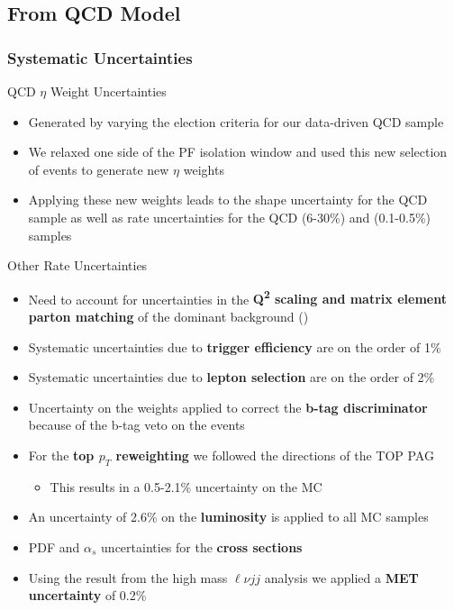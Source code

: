 
\subsection*{From QCD Model}


\begin{frame}
	\frametitle{Systematic Uncertainties}
	\vspace*{-0.24cm}
	\begin{block}{QCD $\eta$ Weight Uncertainties}
		\begin{itemize}
			\footnotesize
			\item Generated by varying the election criteria for our data-driven QCD sample
			\item We relaxed one side of the PF isolation window and used this new selection of events to generate new $\eta$ weights
			\item Applying these new weights leads to the shape uncertainty for the QCD sample as well as rate uncertainties for the QCD (6-30\%) and \Wjets (0.1-0.5\%) samples
		\end{itemize}
	\end{block}
	\vspace*{-0.24cm}
	\begin{block}{Other Rate Uncertainties}
		\begin{itemize}
			\footnotesize
			\item Need to account for uncertainties in the \textbf{Q\textsuperscript{2} scaling and matrix element parton matching} of the dominant background (\Wjets)
			\item Systematic uncertainties due to \textbf{trigger efficiency} are on the order of 1\%
			\item Systematic uncertainties due to \textbf{lepton selection} are on the order of 2\%
			\item Uncertainty on the weights applied to correct the \textbf{b-tag discriminator} because of the b-tag veto on the events
			\item For the \textbf{top $p_{T}$ reweighting} we followed the directions of the TOP PAG
			\begin{itemize}
				\footnotesize
				\item This results in a 0.5-2.1\% uncertainty on the \ttbar MC
			\end{itemize}
			\item An uncertainty of 2.6\% on the \textbf{luminosity} is applied to all MC samples
			\item PDF and $\alpha_{s}$ uncertainties for the \textbf{cross sections}
			\item Using the result from the high mass $\ell{\nu}jj$ analysis we applied a \textbf{MET uncertainty} of 0.2\%
		\end{itemize}
	\end{block}
\end{frame}

